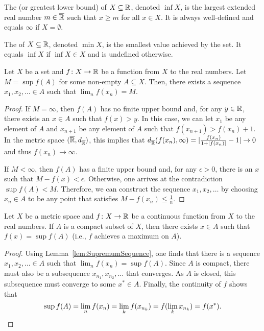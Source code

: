 \begin{definition}
The  (or greatest lower bound) of $X\subseteq \mathbb{R}$, denoted $\inf X$, is the largest extended real number $m \in \overline{\mathbb{R}}$ such that $x\geq m$ for all $x\in X$.
It is always well-defined and equals $\infty$ if $X=\emptyset$.
\end{definition}

\begin{definition}
The  of $X\subseteq \mathbb{R}$, denoted $\min X$, is the smallest value achieved by the set.
It equals $\inf X$ if $\inf X \in X$ and is undefined otherwise.
\end{definition}

\begin{lemma}
\label{lem:SupremumSequence}
Let $X$ be a set and $f \colon X\rightarrow \mathbb{R}$ be a function from $X$ to the real numbers.
Let $M = \sup f(A)$ for some non-empty $A \subseteq X$.
Then, there exists a sequence $x_1,x_2,\ldots \in A$ such that $\lim_n f(x_n) = M$.
\end{lemma}
\begin{proof}
If $M=\infty$, then $f(A)$ has no finite upper bound and, for any $y\in \mathbb{R}$, there exists an $x\in A$ such that $f(x)>y$.
In this case, we can let $x_1$ be any element of $A$ and $x_{n+1}$ be any element of $A$ such that $f(x_{n+1}) > f(x_n) + 1$.
In the metric space $(\overline{\mathbb{R}},d_{\overline{\mathbb{R}}})$, this implies that $d_{\overline{\mathbb{R}}}(f(x_n),\infty) = |\frac{f(x_n)}{1+|f(x_n)|} - 1| \to 0$ and thus $f(x_n) \to \infty$.

If $M<\infty$, then $f(A)$ has a finite upper bound and, for any $\epsilon >0$, there is an $x$ such that $M-f(x)<\epsilon$.
Otherwise, one arrives at the contradiction $\sup f(A) < M$.
Therefore, we can construct the sequence $x_1,x_2,\ldots$ by choosing $x_n\in A$ to be any point that satisfies $M-f(x_n)\leq \frac{1}{n}$.
\end{proof}

\begin{theorem}
Let $X$ be a metric space and $f \colon X\rightarrow \mathbb{R}$ be a continuous function from $X$ to the real numbers.
If $A$ is a compact subset of $X$, then there exists $x\in A$ such that $f(x)=\sup f(A)$ (i.e., $f$ achieves a maximum on $A$).
\end{theorem}
\begin{proof}
Using Lemma~\ref{lem:SupremumSequence}, one finds that there is a sequence $x_1,x_2,\ldots \in A$ such that $\lim_n f(x_n) = \sup f(A)$.
Since $A$ is compact, there must also be a subsequence $x_{n_1},x_{n_2},\ldots$ that converges.
As $A$ is closed, this subsequence must converge to some $x^* \in A$.
Finally, the continuity of $f$ shows that
\[\sup f(A) = \lim_n f(x_n) = \lim_k f(x_{n_k}) = f(\lim_k x_{n_k}) = f(x^*). \qedhere \]
\end{proof}

